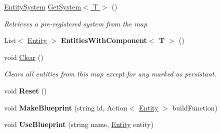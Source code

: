 \begin{DoxyCompactItemize}
\hyperlink{class_m_b2_d_1_1_entity_component_1_1_entity_system}{Entity\+System} \hyperlink{class_m_b2_d_1_1_entity_component_1_1_entity_map_a1240739b3c9be7daeebd2a0ae3cc04ff}{Get\+System$<$ T $>$} ()
\begin{DoxyCompactList}\small\item\em Retrieves a pre-\/registered system from the map \end{DoxyCompactList}\item 
\hypertarget{class_m_b2_d_1_1_entity_component_1_1_entity_map_ab84f162ddcef10ea2076c23d99f8e40f}{}\label{class_m_b2_d_1_1_entity_component_1_1_entity_map_ab84f162ddcef10ea2076c23d99f8e40f} 
List$<$ \hyperlink{class_m_b2_d_1_1_entity_component_1_1_entity}{Entity} $>$ {\bfseries Entities\+With\+Component$<$ T $>$} ()
\item 
void \hyperlink{class_m_b2_d_1_1_entity_component_1_1_entity_map_a079e8e957e7fbaa8de73e609ab646fe1}{Clear} ()
\begin{DoxyCompactList}\small\item\em Clears all entities from this map except for any marked as persistant. \end{DoxyCompactList}\item 
\hypertarget{class_m_b2_d_1_1_entity_component_1_1_entity_map_a3d42b78583ee8cf16a9ce1c2d096ea01}{}\label{class_m_b2_d_1_1_entity_component_1_1_entity_map_a3d42b78583ee8cf16a9ce1c2d096ea01} 
void {\bfseries Reset} ()
\item 
\hypertarget{class_m_b2_d_1_1_entity_component_1_1_entity_map_ad796d08b2566bdfa3862e54ba639e3ae}{}\label{class_m_b2_d_1_1_entity_component_1_1_entity_map_ad796d08b2566bdfa3862e54ba639e3ae} 
void {\bfseries Make\+Blueprint} (string id, Action$<$ \hyperlink{class_m_b2_d_1_1_entity_component_1_1_entity}{Entity} $>$ build\+Function)
\item 
\hypertarget{class_m_b2_d_1_1_entity_component_1_1_entity_map_a11e3a65f0404ad99f2a1aff9b0604d15}{}\label{class_m_b2_d_1_1_entity_component_1_1_entity_map_a11e3a65f0404ad99f2a1aff9b0604d15} 
void {\bfseries Use\+Blueprint} (string name, \hyperlink{class_m_b2_d_1_1_entity_component_1_1_entity}{Entity} entity)
\end{DoxyCompactItemize}
